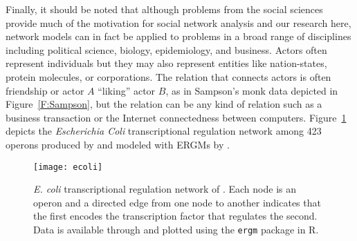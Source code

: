 
Finally, it should be noted that although problems from the social sciences provide much of the 
motivation for social network analysis and our research here, network models can in 
fact be applied to problems in a broad range of disciplines including political 
science, biology, epidemiology, and business.  Actors often represent individuals but 
they may also represent entities like nation-states, protein molecules, or 
corporations.  The relation that connects actors is often friendship or actor $A$ 
``liking'' actor $B$, as in Sampson's monk data depicted in Figure~\ref{F:Sampson}, 
but the relation can be any kind of relation such as a business transaction or the 
Internet connectedness between computers.  Figure~\ref{F:ecoli} depicts the 
\textit{Escherichia Coli} transcriptional regulation network among 423 operons produced by 
\citet*{Salgado,Shen-Orr} and modeled with ERGMs by \citet*{Saul:2007,Hummel}.

\begin{figure}[h]
\begin{center}
\texttt{[image: ecoli]}
\end{center}
\caption{\textit{E. coli} transcriptional regulation network of \citet{Salgado,Shen-Orr}.  Each node is an operon and a directed edge from one node to another indicates 
that the first encodes the transcription factor that regulates the second.
Data is available through and plotted using the \texttt{ergm} package \citep{ergm} in 
R.}
\label{F:ecoli}
\end{figure}



